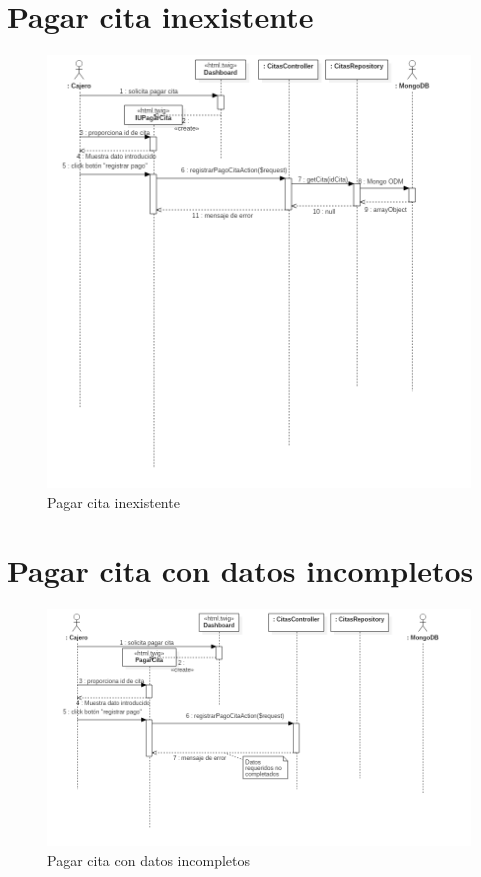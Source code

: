 \section{Pagar cita inexistente}

\begin{figure}[htbp!]
	\centering
	\includegraphics[width=1\textwidth]{uml/DiagramasSecuencia/DavidPacheco/pagar-cita-cita-no-existe}
	\caption{Pagar cita inexistente}
\end{figure}
\newpage
\section{Pagar cita con datos incompletos}

\begin{figure}[htbp!]
	\centering
	\includegraphics[width=1\textwidth]{uml/DiagramasSecuencia/DavidPacheco/pagar-cita-datos-incompletos}
	\caption{Pagar cita con datos incompletos}
\end{figure}

